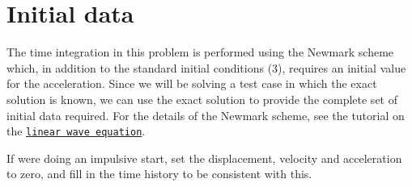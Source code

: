  

\hypertarget{index_initial_data}{}\section{Initial data}\label{index_initial_data}
The time integration in this problem is performed using the Newmark scheme which, in addition to the standard initial conditions (3), requires an initial value for the acceleration. Since we will be solving a test case in which the exact solution is known, we can use the exact solution to provide the complete set of initial data required. For the details of the Newmark scheme, see the tutorial on the \href{../../../linear_wave/two_d_linear_wave/html/index.html}{\tt linear wave equation}.

If we\textquotesingle{}re doing an impulsive start, set the displacement, velocity and acceleration to zero, and fill in the time history to be consistent with this.

